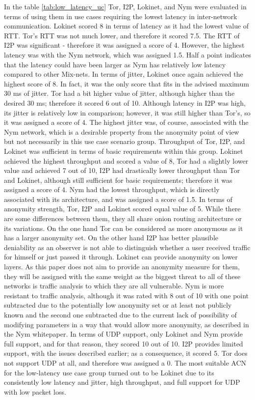 In the table \ref{tab:low_latency_uc} Tor, I2P, Lokinet, and Nym were evaluated in terms of using them in use cases requiring the lowest latency in inter-network communication. Lokinet scored 8 in terms of latency as it had the lowest value of RTT. Tor's RTT was not much lower, and therefore it scored 7.5. The RTT of I2P was significant - therefore it was assigned a score of 4. However, the highest latency was with the Nym network, which was assigned 1.5. Half a point indicates that the latency could have been larger as Nym has relatively low latency compared to other Mix-nets.
In terms of jitter, Lokinet once again achieved the highest score of 8. In fact, it was the only score that fits in the advised maximum 30 ms of jitter. Tor had a bit higher value of jitter, although higher than the desired 30 ms; therefore it scored 6 out of 10. Although latency in I2P was high, its jitter is relatively low in comparison; however, it was still higher than Tor's, so it was assigned a score of 4. The highest jitter was, of course, associated with the Nym network, which is a desirable property from the anonymity point of view but not necessarily in this use case scenario group.
Throughput of Tor, I2P, and Lokinet was sufficient in terms of basic requirements within this group. Lokinet achieved the highest throughput and scored a value of 8, Tor had a slightly lower value and achieved 7 out of 10, I2P had drastically lower throughput than Tor and Lokinet, although still sufficient for basic requirements; therefore it was assigned a score of 4. Nym had the lowest throughput, which is directly associated with its architecture, and was assigned a score of 1.5.
In terms of anonymity strength, Tor, I2P and Lokinet scored equal value of 5. While there are some differences between them, they all share onion routing architecture or its variations. On the one hand Tor can be considered as more anonymous as it has a larger anonymity set. On the other hand I2P has better plausible deniability as an observer is not able to distinguish whether a user received traffic for himself or just passed it through. Lokinet can provide anonymity on lower layers. As this paper does not aim to provide an anonymity measure for them, they will be assigned with the same weight as the biggest threat to all of these networks is traffic analysis to which they are all vulnerable. Nym is more resistant to traffic analysis, although it was rated with 8 out of 10 with one point subtracted due to the potentially low anonymity set or at least not publicly known and the second one subtracted due to the current lack of possibility of modifying parameters in a way that would allow more anonymity, as described in the Nym whitepaper.
In terms of UDP support, only Lokinet and Nym provide full support, and for that reason, they scored 10 out of 10. I2P provides limited support, with the issues described earlier; as a consequence, it scored 5. Tor does not support UDP at all, and therefore was assigned a 0.
The most suitable ACN for the low-latency use case group turned out to be Lokinet due to its consistently low latency and jitter, high throughput, and full support for UDP with low packet loss.

